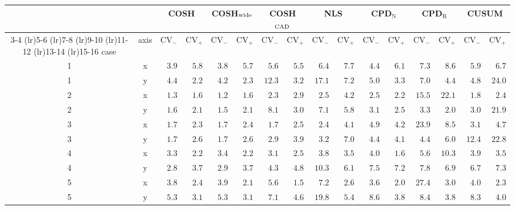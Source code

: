 \documentclass[10pt]{article}
\begin{document}
\begin{table}[t]
\centering
\footnotesize
\setlength{\tabcolsep}{2.2pt}
\begin{tabular}{cc rr rr rr rr rr rr rr}
\toprule
 & & \multicolumn{2}{c}{COSH} & \multicolumn{2}{c}{COSH$_{\rm wide}$} & \multicolumn{2}{c}{COSH$_{\rm CAD}$} & \multicolumn{2}{c}{NLS} & \multicolumn{2}{c}{CPD$_{\mathrm{N}}$} & \multicolumn{2}{c}{CPD$_{\mathrm{R}}$} & \multicolumn{2}{c}{CUSUM} \\
\cmidrule(lr){3-4} \cmidrule(lr){5-6} \cmidrule(lr){7-8} \cmidrule(lr){9-10} \cmidrule(lr){11-12} \cmidrule(lr){13-14} \cmidrule(lr){15-16}
case & axis & $\mathrm{CV}_{-}$ & $\mathrm{CV}_{+}$ & $\mathrm{CV}_{-}$ & $\mathrm{CV}_{+}$ & $\mathrm{CV}_{-}$ & $\mathrm{CV}_{+}$ & $\mathrm{CV}_{-}$ & $\mathrm{CV}_{+}$ & $\mathrm{CV}_{-}$ & $\mathrm{CV}_{+}$ & $\mathrm{CV}_{-}$ & $\mathrm{CV}_{+}$ & $\mathrm{CV}_{-}$ & $\mathrm{CV}_{+}$ \\
\midrule
1 & x & $3.9$ & $5.8$ & $\mathbf{3.8}$ & $5.7$ & $5.6$ & $\mathbf{5.5}$ & $6.4$ & $7.7$ & $4.4$ & $6.1$ & $7.3$ & $8.6$ & $5.9$ & $6.7$ \\
1 & y & $4.4$ & $\mathbf{2.2}$ & $\mathbf{4.2}$ & $2.3$ & $12.3$ & $3.2$ & $17.1$ & $7.2$ & $5.0$ & $3.3$ & $7.0$ & $4.4$ & $4.8$ & $24.0$ \\
2 & x & $1.3$ & $\mathbf{1.6}$ & $\mathbf{1.2}$ & $1.6$ & $2.3$ & $2.9$ & $2.5$ & $4.2$ & $2.5$ & $2.2$ & $15.5$ & $22.1$ & $1.8$ & $2.4$ \\
2 & y & $1.6$ & $2.1$ & $\mathbf{1.5}$ & $2.1$ & $8.1$ & $3.0$ & $7.1$ & $5.8$ & $3.1$ & $2.5$ & $3.3$ & $\mathbf{2.0}$ & $3.0$ & $21.9$ \\
3 & x & $\mathbf{1.7}$ & $\mathbf{2.3}$ & $1.7$ & $2.4$ & $1.7$ & $2.5$ & $2.4$ & $4.1$ & $4.9$ & $4.2$ & $23.9$ & $8.5$ & $3.1$ & $4.7$ \\
3 & y & $\mathbf{1.7}$ & $2.6$ & $1.7$ & $\mathbf{2.6}$ & $2.9$ & $3.9$ & $3.2$ & $7.0$ & $4.4$ & $4.1$ & $4.4$ & $6.0$ & $12.4$ & $22.8$ \\
4 & x & $3.3$ & $2.2$ & $3.4$ & $2.2$ & $\mathbf{3.1}$ & $2.5$ & $3.8$ & $3.5$ & $4.0$ & $\mathbf{1.6}$ & $5.6$ & $10.3$ & $3.9$ & $3.5$ \\
4 & y & $\mathbf{2.8}$ & $\mathbf{3.7}$ & $2.9$ & $3.7$ & $4.3$ & $4.8$ & $10.3$ & $6.1$ & $7.5$ & $7.2$ & $7.8$ & $6.9$ & $6.7$ & $7.3$ \\
5 & x & $3.8$ & $2.4$ & $3.9$ & $2.1$ & $5.6$ & $\mathbf{1.5}$ & $7.2$ & $2.6$ & $\mathbf{3.6}$ & $2.0$ & $27.4$ & $3.0$ & $4.0$ & $2.3$ \\
5 & y & $5.3$ & $\mathbf{3.1}$ & $\mathbf{5.3}$ & $3.1$ & $7.1$ & $4.6$ & $19.8$ & $5.4$ & $8.6$ & $3.8$ & $8.4$ & $3.8$ & $8.3$ & $4.0$ \\

\end{tabular}
\end{table}
\end{document}
